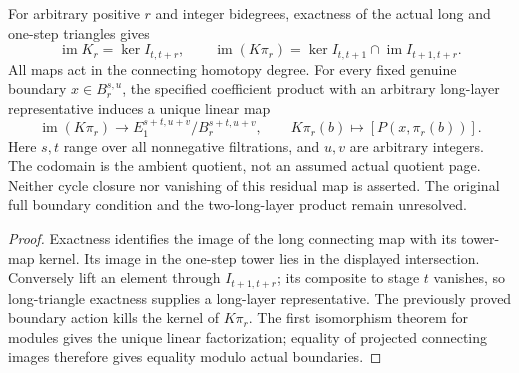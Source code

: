 \begin{proposition}
  \label{prop:h6-boundary-connecting-action}
  \leanok
  For arbitrary positive $r$ and integer bidegrees, exactness of the
  actual long and one-step triangles gives
  \[
    \operatorname{im}K_r=\ker I_{t,t+r},\qquad
    \operatorname{im}(K\pi_r)=
      \ker I_{t,t+1}\cap\operatorname{im}I_{t+1,t+r}.
  \]
  All maps act in the connecting homotopy degree. For every fixed
  genuine boundary $x\in B_r^{s,u}$, the specified coefficient product
  with an arbitrary long-layer representative induces a unique linear map
  \[
    \operatorname{im}(K\pi_r)\longrightarrow E_1^{s+t,u+v}/B_r^{s+t,u+v},
    \qquad K\pi_r(b)\longmapsto [P(x,\pi_r(b))].
  \]
  Here $s,t$ range over all nonnegative filtrations, and $u,v$ are
  arbitrary integers. The codomain is the ambient quotient, not an
  assumed actual quotient page. Neither cycle closure nor vanishing of
  this residual map is asserted. The original full boundary condition
  and the two-long-layer product remain unresolved.
\end{proposition}
\begin{proof}
  Exactness identifies the image of the long connecting map with its
  tower-map kernel. Its image in the one-step tower lies in the displayed
  intersection. Conversely lift an element through $I_{t+1,t+r}$; its
  composite to stage $t$ vanishes, so long-triangle exactness supplies a
  long-layer representative. The previously proved boundary action kills
  the kernel of $K\pi_r$. The first isomorphism theorem for modules gives
  the unique linear factorization; equality of projected connecting
  images therefore gives equality modulo actual boundaries.
  \leanok
\end{proof}

